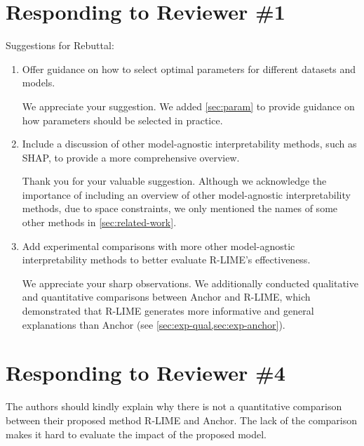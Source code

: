 \documentclass[runningheads]{llncs}
\begin{document}
\section*{Responding to Reviewer \#1}
Suggestions for Rebuttal:
\begin{enumerate}
  \setlength{\itemsep}{15pt}
  \item Offer guidance on how to select optimal parameters for different
        datasets and models.

        \begin{mycomment}
          We appreciate your suggestion.
          We added \cref{sec:param} to provide guidance on
          how parameters should be selected in practice.
        \end{mycomment}

  \item Include a discussion of other model-agnostic interpretability methods,
        such as SHAP, to provide a more comprehensive overview.

        \begin{mycomment}
          Thank you for your valuable suggestion.
          Although we acknowledge the importance of including an overview of
          other model-agnostic interpretability methods,
          due to space constraints, we only mentioned the names of some
          other methods in \cref{sec:related-work}.
        \end{mycomment}

  \item Add experimental comparisons with more other model-agnostic \\
        interpretability methods to better evaluate R-LIME's effectiveness.

        \begin{mycomment}
          We appreciate your sharp observations.
          We additionally conducted qualitative and quantitative comparisons
          between Anchor and R-LIME,
          which demonstrated that R-LIME generates more informative and
          general explanations than Anchor (see \cref{sec:exp-qual,sec:exp-anchor}).
        \end{mycomment}
\end{enumerate}
\section*{Responding to Reviewer \#4}
The authors should kindly explain why there is not a quantitative comparison
between their proposed method R-LIME and Anchor. The lack of the comparison
makes it hard to evaluate the impact of the proposed model.
\end{document}
